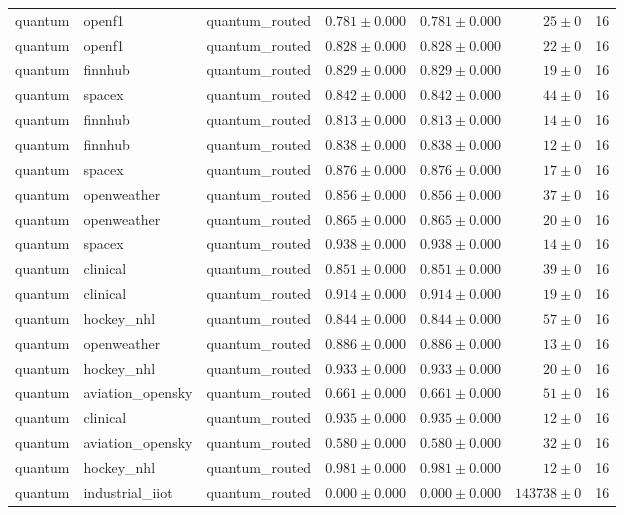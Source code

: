 \begin{table}[htbp]
\begin{tabular}{l l l r r r r}
quantum & openf1 & quantum\_routed & $0.781\pm0.000$ & $0.781\pm0.000$ & $25\pm0$ & 16 \\
quantum & openf1 & quantum\_routed & $0.828\pm0.000$ & $0.828\pm0.000$ & $22\pm0$ & 16 \\
quantum & finnhub & quantum\_routed & $0.829\pm0.000$ & $0.829\pm0.000$ & $19\pm0$ & 16 \\
quantum & spacex & quantum\_routed & $0.842\pm0.000$ & $0.842\pm0.000$ & $44\pm0$ & 16 \\
quantum & finnhub & quantum\_routed & $0.813\pm0.000$ & $0.813\pm0.000$ & $14\pm0$ & 16 \\
quantum & finnhub & quantum\_routed & $0.838\pm0.000$ & $0.838\pm0.000$ & $12\pm0$ & 16 \\
quantum & spacex & quantum\_routed & $0.876\pm0.000$ & $0.876\pm0.000$ & $17\pm0$ & 16 \\
quantum & openweather & quantum\_routed & $0.856\pm0.000$ & $0.856\pm0.000$ & $37\pm0$ & 16 \\
quantum & openweather & quantum\_routed & $0.865\pm0.000$ & $0.865\pm0.000$ & $20\pm0$ & 16 \\
quantum & spacex & quantum\_routed & $0.938\pm0.000$ & $0.938\pm0.000$ & $14\pm0$ & 16 \\
quantum & clinical & quantum\_routed & $0.851\pm0.000$ & $0.851\pm0.000$ & $39\pm0$ & 16 \\
quantum & clinical & quantum\_routed & $0.914\pm0.000$ & $0.914\pm0.000$ & $19\pm0$ & 16 \\
quantum & hockey\_nhl & quantum\_routed & $0.844\pm0.000$ & $0.844\pm0.000$ & $57\pm0$ & 16 \\
quantum & openweather & quantum\_routed & $0.886\pm0.000$ & $0.886\pm0.000$ & $13\pm0$ & 16 \\
quantum & hockey\_nhl & quantum\_routed & $0.933\pm0.000$ & $0.933\pm0.000$ & $20\pm0$ & 16 \\
quantum & aviation\_opensky & quantum\_routed & $0.661\pm0.000$ & $0.661\pm0.000$ & $51\pm0$ & 16 \\
quantum & clinical & quantum\_routed & $0.935\pm0.000$ & $0.935\pm0.000$ & $12\pm0$ & 16 \\
quantum & aviation\_opensky & quantum\_routed & $0.580\pm0.000$ & $0.580\pm0.000$ & $32\pm0$ & 16 \\
quantum & hockey\_nhl & quantum\_routed & $0.981\pm0.000$ & $0.981\pm0.000$ & $12\pm0$ & 16 \\
quantum & industrial\_iiot & quantum\_routed & $0.000\pm0.000$ & $0.000\pm0.000$ & $143738\pm0$ & 16 \\

\end{tabular}
\end{table}
